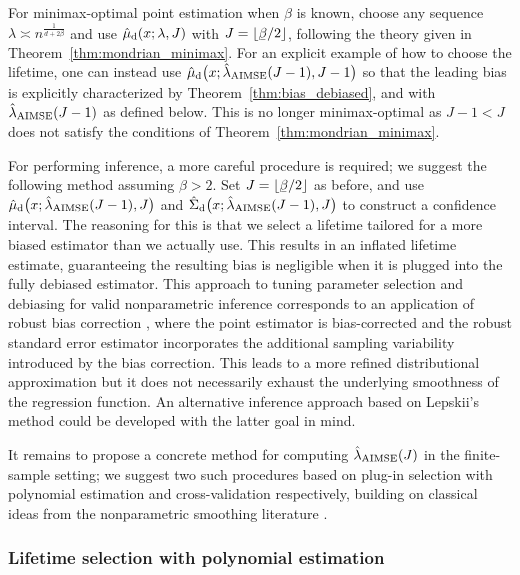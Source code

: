 For minimax-optimal point estimation when $\beta$ is known,
choose any sequence $\lambda \asymp n^{\frac{1}{d + 2\beta}}$
and use $\hat\mu_{\mathrm{d}}(x; \lambda, J)$ with
$J = \lfloor \flbeta / 2 \rfloor$,
following the theory given in Theorem~\ref{thm:mondrian_minimax}.
For an explicit example of how to choose the lifetime,
one can instead use
$\hat\mu_{\mathrm{d}}\big(x; \hat\lambda_{\operatorname{AIMSE}}(J-1), J-1\big)$
so that the leading bias is explicitly characterized by
Theorem~\ref{thm:bias_debiased},
and with $\hat\lambda_{\operatorname{AIMSE}}(J-1)$ as defined below.
This is no longer minimax-optimal as $J-1 < J$
does not satisfy the conditions of Theorem~\ref{thm:mondrian_minimax}.

For performing inference, a more careful procedure is required;
we suggest the following method assuming $\beta > 2$.
Set $J = \lfloor \flbeta / 2 \rfloor$ as before,
and use $\hat\mu_{\mathrm{d}}\big(x; \hat\lambda_{\operatorname{AIMSE}}(J-1), J\big)$
and $\hat\Sigma_{\mathrm{d}}\big(x; \hat\lambda_{\operatorname{AIMSE}}(J-1), J\big)$
to construct a confidence interval.
The reasoning for this is that we select a lifetime tailored
for a more biased estimator than we actually use.
This results in an inflated lifetime estimate, guaranteeing
the resulting bias is negligible when it is
plugged into the fully debiased estimator.
This approach to tuning parameter selection
and debiasing for valid nonparametric
inference corresponds to an application of robust bias correction
\citep{calonico2018jasa,calonico2022bernoulli},
where the point estimator is bias-corrected
and the robust standard error estimator incorporates the additional
sampling variability introduced by the bias correction.
This leads to a more refined distributional approximation
but it does not necessarily exhaust the underlying
smoothness of the regression function.
An alternative inference approach based on Lepskii's method
\citep{lepskii1992asymptotically,birge2001alternative}
could be developed with the latter goal in mind.

It remains to propose a concrete method for computing
$\hat\lambda_{\operatorname{AIMSE}}(J)$
in the finite-sample setting; we suggest two such procedures
based on plug-in selection with polynomial estimation and
cross-validation respectively,
building on classical ideas from the nonparametric
smoothing literature \citep{fan2020statistical}.

\subsubsection*{Lifetime selection with polynomial estimation}

